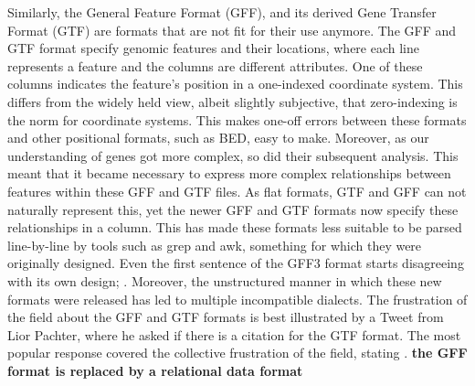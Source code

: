 Similarly, the General Feature Format (GFF), and its derived Gene Transfer Format (GTF) are formats that are not fit for their use anymore. The GFF and GTF format specify genomic features and their locations, where each line represents a feature and the columns are different attributes. One of these columns indicates the feature's position in a one-indexed coordinate system. This differs from the widely held view, albeit slightly subjective, that zero-indexing is the norm for coordinate systems\cite{utexasEWDijkstra}. This makes one-off errors between these formats and other positional formats, such as BED, easy to make. Moreover, as our understanding of genes got more complex, so did their subsequent analysis. This meant that it became necessary to express more complex relationships between features within these GFF and GTF files. As flat formats, GTF and GFF can not naturally represent this, yet the newer GFF and GTF formats now specify these relationships in a  column. This has made these formats less suitable to be parsed line-by-line by tools such as grep and awk, something for which they were originally designed. Even the first sentence of the GFF3 format starts disagreeing with its own design; \cite{GFFformat}. Moreover, the unstructured manner in which these new formats were released has led to multiple incompatible dialects. The frustration of the field about the GFF and GTF formats is best illustrated by a Tweet from Lior Pachter, where he asked if there is a citation for the GTF format. The most popular response covered the collective frustration of the field, stating \cite{Pachter_2023}. \textbf{the GFF format is replaced by a relational data format}


